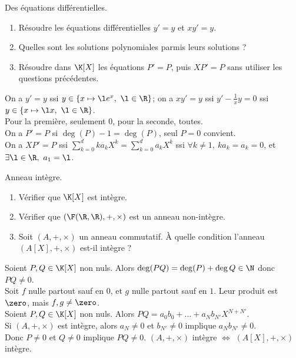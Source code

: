 \documentclass[11pt]{article}
\begin{document}
\begin{ex}{Des équations différentielles.}{}
    \begin{enumerate}
        \item Résoudre les équations différentielles $y'=y$ et $xy'=y$.
        \item Quelles sont les solutions polynomiales parmis leurs solutions ?
        \item Résoudre dans $\K[X]$ les équations $P'=P$, puis $XP'=P$ sans utiliser les questions précédentes.
    \end{enumerate}
    \tcblower
     On a $y'=y$ ssi $y\in\{x\mapsto \l e^x, ~ \l\in\R\}$; on a $xy'=y$ ssi $y'-\frac{1}{x}y=0$ ssi $y\in \{x\mapsto \l x, ~ \l \in \R\}$.\\
     Pour la première, seulement $0$, pour la seconde, toutes.\\
     On a $P'=P$ si $\deg(P)-1=\deg(P)$, seul $P=0$ convient.\\
    On a $XP'=P$ ssi $\sum_{k=0}^d ka_k X^k=\sum_{k=0}^d a_k X^k$ ssi $\forall k \neq 1, ~ ka_k=a_k=0$, et $\exists \l \in \R, ~ a_1=\l$. 
\end{ex}

\vspace*{-0.8cm}

\begin{ex}{Anneau intègre.}{}
    \begin{enumerate}
        \item Vérifier que $\K[X]$ est intègre.
        \item Vérifier que $(\F(\R,\R), +, \times)$ est un anneau non-intègre.
        \item Soit $(A,+,\times)$ un anneau commutatif. À quelle condition l'anneau $(A[X],+,\times)$ est-il intègre ?
    \end{enumerate}
    \tcblower
     Soient $P,Q\in\K[X]$ non nuls. Alors $\deg(PQ)=\deg(P)+\deg{Q}\in\N$ donc $PQ\neq0$.\\
     Soit $f$ nulle partout sauf en $0$, et $g$ nulle partout sauf en $1$. Leur produit est $\zero$, mais $f,g\neq\zero$.\\ 
     Soient $P,Q\in\K[X]$ non nuls. Alors $PQ=a_0b_0+...+a_Nb_{N'}X^{N+N'}$.\\
    Si $(A,+,\times)$ est intègre, alors $a_N\neq0$ et $b_{N'}\neq0$ implique $a_Nb_{N'}\neq0$.\\
    Donc $P\neq0$ et $Q\neq0$ implique $PQ\neq0$. $(A,+,\times)$ intègre $\iff$ $(A[X],+,\times)$ intègre.
\end{ex}
\end{document}
